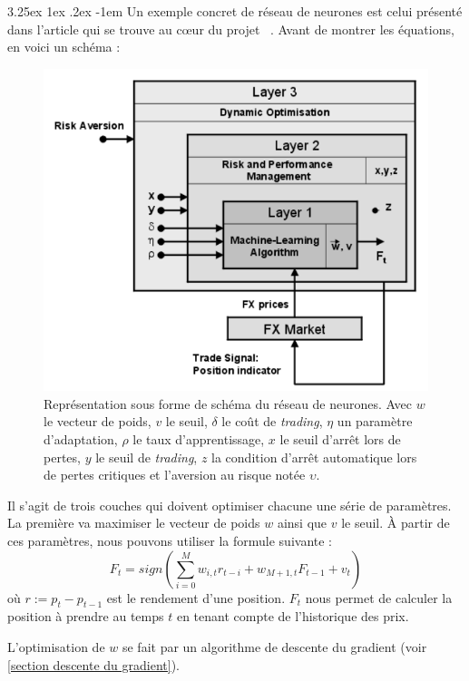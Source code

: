 \documentclass[a4paper, 11pt]{article}
\makeatletter
\renewcommand\paragraph{\@startsection{paragraph}{5}{\z@}%
  {3.25ex \@plus1ex \@minus.2ex}%
  {-1em}%
  {\normalfont\normalsize\bfseries}}
\makeatother
\begin{document}
\paragraph{}
Un exemple concret de réseau de neurones est celui présenté dans l'article qui se trouve au cœur du projet ~\cite{fx_trading}.
Avant de montrer les équations, en voici un schéma \cite{fx_trading}:
\begin{figure}[H]
 \centering
 \includegraphics[scale=0.4]{images/exemple_nn_projet}
 \caption{Représentation sous forme de schéma du réseau de neurones. Avec $w$ le vecteur de poids, $v$ le seuil, $\delta$ le coût de
 \textit{trading}, $\eta$ un paramètre d'adaptation, $\rho$ le taux d'apprentissage, $x$ le seuil d'arrêt lors de pertes, $y$ le
 seuil de \textit{trading}, $z$ la condition d'arrêt automatique lors de pertes critiques et l'aversion au risque notée $\upsilon$.}
\end{figure}

Il s'agit de trois couches qui doivent optimiser chacune une série de paramètres. La première va maximiser le vecteur de poids $w$
ainsi que $v$ le seuil. À partir de ces paramètres, nous pouvons utiliser la formule suivante :
$$F_t = sign(\sum_{i=0}^M w_{i,t} r_{t-i} + w_{M+1,t} F_{t-1} + v_t)$$
où $r := p_t - p_{t-1}$ est le rendement d'une position. $F_t$ nous permet de calculer la position à prendre au temps $t$ en tenant
compte de l'historique des prix.

L'optimisation de $w$ se fait par un algorithme de descente du gradient (voir \ref{section descente du gradient}).
\end{document}
